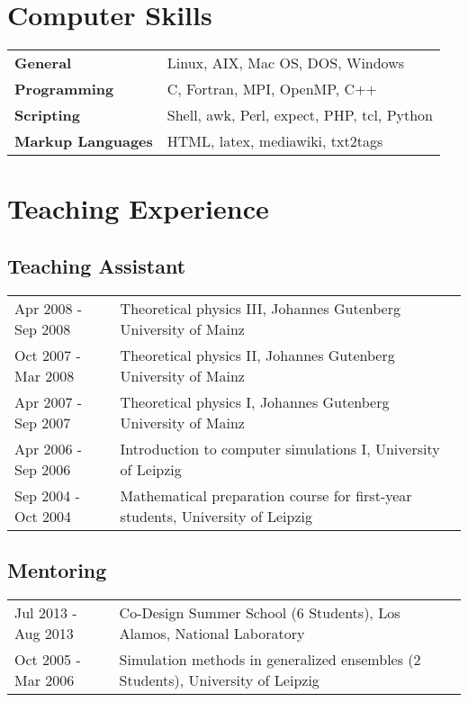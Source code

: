 \documentclass{article}
\begin{document}
\section*{Computer Skills}

\begin{tabular}{ll}
\textbf{General} & Linux, AIX, Mac OS, DOS, Windows \\
\textbf{Programming} & C, Fortran, MPI, OpenMP, C++ \\
\textbf{Scripting} & Shell, awk, Perl, expect, PHP, tcl, Python\\
\textbf{Markup Languages} & HTML, latex, mediawiki, txt2tags \\
\end{tabular}

\section*{Teaching Experience}

\subsection*{Teaching Assistant}

\begin{tabular}{p{}p{}}
Apr 2008 - Sep 2008 & Theoretical physics III, Johannes Gutenberg University of Mainz \\
Oct 2007 - Mar 2008 & Theoretical physics II, Johannes Gutenberg University of Mainz \\
Apr 2007 - Sep 2007 & Theoretical physics I, Johannes Gutenberg University of Mainz \\
Apr 2006 - Sep 2006 & Introduction to computer simulations I, University of Leipzig \\
Sep 2004 - Oct 2004 & Mathematical preparation course for first-year students, University of Leipzig \\
\end{tabular}

\subsection*{Mentoring}

\begin{tabular}{p{}p{}}
Jul 2013 - Aug 2013 & Co-Design Summer School (6 Students), Los Alamos, National Laboratory \\
Oct 2005 - Mar 2006 & Simulation methods in generalized ensembles (2 Students), University of Leipzig \\
\end{tabular}
\end{document}
